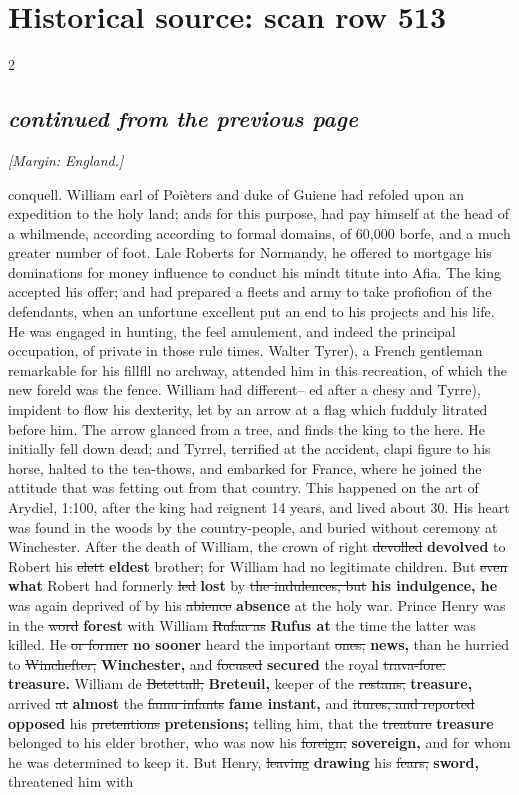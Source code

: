 \documentclass[10pt]{article}
\begin{document}
\section*{Historical source: scan row 513}
\begin{multicols}{2}
\subsection*{\textit{continued from the previous page}}
{\small\itshape [Margin: England.]}\par
conquell. William earl of Poièters and duke of Guiene had refoled upon an expedition to the holy land; ands for this purpose, had pay himself at the head of a whilmende, according according to formal domains, of 60,000 borfe, and a much greater number of foot. Lale Roberts for Normandy, he offered to mortgage his dominations for money influence to conduct his mindt titute into Afia. The king accepted his offer; and had prepared a fleets and army to take profiofion of the defendants, when an unfortune excellent put an end to his projects and his life. He was engaged in hunting, the feel amulement, and indeed the principal occupation, of private in those rule times. Walter Tyrer), a French gentleman remarkable for his fillfll no archway, attended him in this recreation, of which the new foreld was the fence. William had different– ed after a chesy and Tyrre), impident to flow his dexterity, let by an arrow at a flag which fudduly litrated before him. The arrow glanced from a tree, and finds the king to the here. He initially fell down dead; and Tyrrel, terrified at the accident, clapi figure to his horse, halted to the tea-thows, and embarked for France, where he joined the attitude that was fetting out from that country. This happened on the art of Arydiel, 1:100, after the king had reignent 14 years, and lived about 30. His heart was found in the woods by the country-people, and buried without ceremony at Winchester. After the death of William, the crown of right \sout{devolled} \textbf{devolved} to Robert his \sout{elett} \textbf{eldest} brother; for William had no legitimate children. But \sout{even} \textbf{what} Robert had formerly \sout{led} \textbf{lost} by \sout{the indulences, but} \textbf{his indulgence, he} was again deprived of by his \sout{abience} \textbf{absence} at the holy war. Prince Henry was in the \sout{word} \textbf{forest} with William \sout{Rufaa as} \textbf{Rufus at} the time the latter was killed. He \sout{or former} \textbf{no sooner} heard the important \sout{ones,} \textbf{news,} than he hurried to \sout{Winchefter,} \textbf{Winchester,} and \sout{focused} \textbf{secured} the royal \sout{trava-fore.} \textbf{treasure.} William de \sout{Betettall,} \textbf{Breteuil,} keeper of the \sout{restans,} \textbf{treasure,} arrived \sout{at} \textbf{almost} the \sout{famu infants} \textbf{fame instant,} and \sout{itures, and reported} \textbf{opposed} his \sout{pretentions} \textbf{pretensions;} telling him, that the \sout{treature} \textbf{treasure} belonged to his elder brother, who was now his \sout{foreign,} \textbf{sovereign,} and for whom he was determined to keep it. But Henry, \sout{leaving} \textbf{drawing} his \sout{fears,} \textbf{sword,} threatened him with 
\end{multicols}
\end{document}
